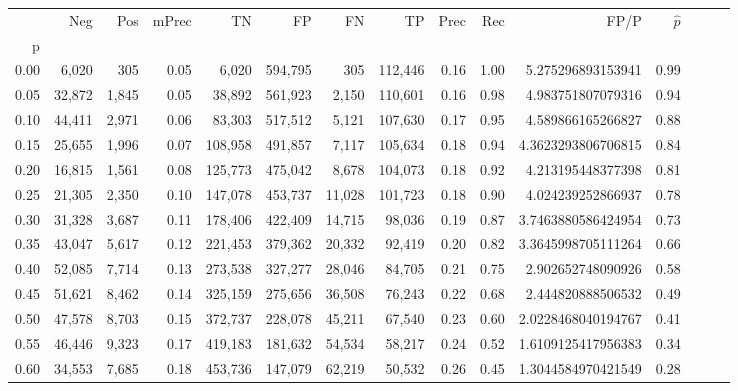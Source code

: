 \begin{tabular}{rrrrrrrrrrrrrrr}
\toprule
{} &     Neg &     Pos & mPrec &       TN &       FP &       FN &       TP &  Prec &   Rec &                  FP/P & $\hat{p}$ \\
p    &         &         &       &          &          &          &          &       &       &                       &           \\
\midrule
0.00 &   6,020 &     305 &  0.05 &    6,020 &  594,795 &      305 &  112,446 &  0.16 &  1.00 &     5.275296893153941 &      0.99 \\
0.05 &  32,872 &   1,845 &  0.05 &   38,892 &  561,923 &    2,150 &  110,601 &  0.16 &  0.98 &     4.983751807079316 &      0.94 \\
0.10 &  44,411 &   2,971 &  0.06 &   83,303 &  517,512 &    5,121 &  107,630 &  0.17 &  0.95 &     4.589866165266827 &      0.88 \\
0.15 &  25,655 &   1,996 &  0.07 &  108,958 &  491,857 &    7,117 &  105,634 &  0.18 &  0.94 &    4.3623293806706815 &      0.84 \\
0.20 &  16,815 &   1,561 &  0.08 &  125,773 &  475,042 &    8,678 &  104,073 &  0.18 &  0.92 &     4.213195448377398 &      0.81 \\
0.25 &  21,305 &   2,350 &  0.10 &  147,078 &  453,737 &   11,028 &  101,723 &  0.18 &  0.90 &     4.024239252866937 &      0.78 \\
0.30 &  31,328 &   3,687 &  0.11 &  178,406 &  422,409 &   14,715 &   98,036 &  0.19 &  0.87 &    3.7463880586424954 &      0.73 \\
0.35 &  43,047 &   5,617 &  0.12 &  221,453 &  379,362 &   20,332 &   92,419 &  0.20 &  0.82 &    3.3645998705111264 &      0.66 \\
0.40 &  52,085 &   7,714 &  0.13 &  273,538 &  327,277 &   28,046 &   84,705 &  0.21 &  0.75 &     2.902652748090926 &      0.58 \\
0.45 &  51,621 &   8,462 &  0.14 &  325,159 &  275,656 &   36,508 &   76,243 &  0.22 &  0.68 &     2.444820888506532 &      0.49 \\
0.50 &  47,578 &   8,703 &  0.15 &  372,737 &  228,078 &   45,211 &   67,540 &  0.23 &  0.60 &    2.0228468040194767 &      0.41 \\
0.55 &  46,446 &   9,323 &  0.17 &  419,183 &  181,632 &   54,534 &   58,217 &  0.24 &  0.52 &    1.6109125417956383 &      0.34 \\
0.60 &  34,553 &   7,685 &  0.18 &  453,736 &  147,079 &   62,219 &   50,532 &  0.26 &  0.45 &    1.3044584970421549 &      0.28 \\

\end{tabular}
